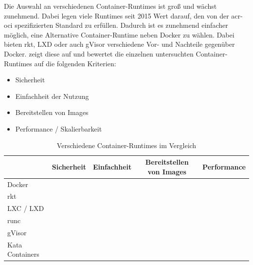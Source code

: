 Die Auswahl an verschiedenen Container-Runtimes ist groß und wächst zunehmend. Dabei legen viele Runtimes seit 2015 Wert darauf, den von der \gls{acr-oci} spezifizierten Standard zu erfüllen. Dadurch ist es zunehmend einfacher möglich, eine Alternative Container-Runtime neben Docker zu wählen. Dabei bieten rkt, LXD oder auch gVisor verschiedene Vor- und Nachteile gegenüber Docker.  zeigt diese auf und bewertet die einzelnen untersuchten Container-Runtimes auf die folgenden Kriterien: 
\begin{itemize}
	\item Sicherheit
	\item Einfachheit der Nutzung
	\item Bereitstellen von Images
	\item Performance / Skalierbarkeit
\end{itemize}


\begin{table}[h]
	\renewcommand{\arraystretch}{1.2}
	\begin{center}
		\begin{tabu}to 0.9
			\toprule
			                & Sicherheit & Einfachheit & Bereitstellen von Images & Performance \\ \midrule
			Docker          &            &             &                          &             \\
			rkt             &            &             &                          &             \\
			LXC / LXD       &            &             &                          &             \\
			runc            &            &             &                          &             \\
			gVisor          &            &             &                          &             \\
			Kata Containers &            &             &                          &             \\ \bottomrule
		\end{tabu}
		\caption{Verschiedene Container-Runtimes im Vergleich}
		\label{tab:compRuntimesFazit}
	\end{center}
\end{table}

